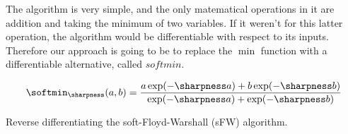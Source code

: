 The algorithm is very simple, and the only matematical operations in it are addition and taking the minimum of two variables. If it weren't for this latter operation, the algorithm would be differentiable with respect to its inputs. Therefore our approach is going to be to replace the $\min$ function with a differentiable alternative, called $softmin$.

\begin{equation}
	\softmin_{\sharpness}(a,b) = \frac{a\exp(-\sharpness a) + b\exp(-\sharpness b)}{\exp(-\sharpness a)+\exp(-\sharpness b)}
\end{equation}

Reverse differentiating the soft-Floyd-Warshall (sFW) algorithm.

